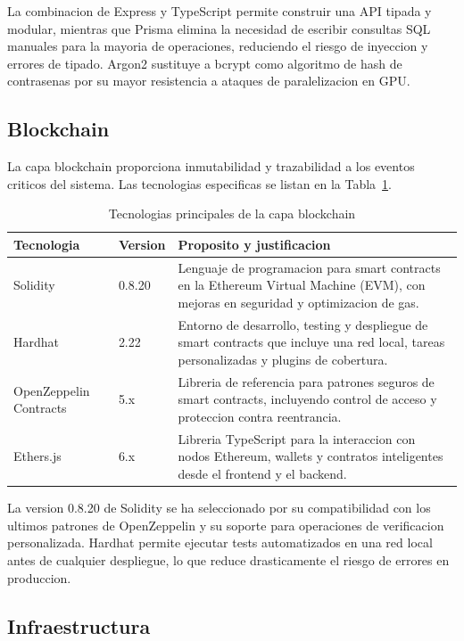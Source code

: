 \documentclass[11pt, a4paper]{article}
\begin{document}
La combinacion de Express y TypeScript permite construir una API tipada y modular, mientras que Prisma elimina la necesidad de escribir consultas SQL manuales para la mayoria de operaciones, reduciendo el riesgo de inyeccion y errores de tipado. Argon2 sustituye a bcrypt como algoritmo de hash de contrasenas por su mayor resistencia a ataques de paralelizacion en GPU.

\subsection{Blockchain}

La capa blockchain proporciona inmutabilidad y trazabilidad a los eventos criticos del sistema. Las tecnologias especificas se listan en la Tabla~\ref{tab:tech-blockchain}.

\begin{table}[H]
\centering
\renewcommand{\arraystretch}{1.4}
\small
\begin{tabular}{@{}llp{7.5cm}@{}}
\toprule
\textbf{Tecnologia} & \textbf{Version} & \textbf{Proposito y justificacion} \\
\midrule
Solidity & 0.8.20 & Lenguaje de programacion para smart contracts en la Ethereum Virtual Machine (EVM), con mejoras en seguridad y optimizacion de gas. \\
Hardhat & 2.22 & Entorno de desarrollo, testing y despliegue de smart contracts que incluye una red local, tareas personalizadas y plugins de cobertura. \\
OpenZeppelin Contracts & 5.x & Libreria de referencia para patrones seguros de smart contracts, incluyendo control de acceso y proteccion contra reentrancia. \\
Ethers.js & 6.x & Libreria TypeScript para la interaccion con nodos Ethereum, wallets y contratos inteligentes desde el frontend y el backend. \\
\bottomrule
\end{tabular}
\caption{Tecnologias principales de la capa blockchain}
\label{tab:tech-blockchain}
\end{table}

La version 0.8.20 de Solidity se ha seleccionado por su compatibilidad con los ultimos patrones de OpenZeppelin y su soporte para operaciones de verificacion personalizada. Hardhat permite ejecutar tests automatizados en una red local antes de cualquier despliegue, lo que reduce drasticamente el riesgo de errores en produccion.

\subsection{Infraestructura}
\end{document}
